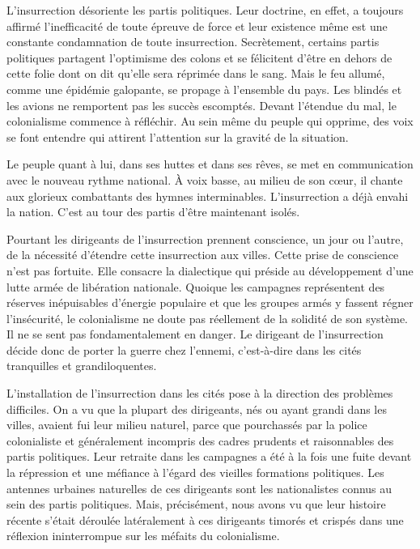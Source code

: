 \documentclass[french,twoside]{book} %
\begin{document}
\bigbreak
\noindent L’insurrection désoriente les partis politiques. Leur doctrine, en effet, a toujours affirmé l’inefficacité de toute épreuve de force et leur existence même est une constante condamnation de toute insurrection. Secrètement, certains partis politiques partagent l’optimisme des colons et se félicitent d’être en dehors de cette folie dont on dit qu’elle sera réprimée dans le sang. Mais le feu allumé, comme une épidémie galopante, se propage à l’ensemble du pays. Les blindés et les avions ne remportent pas les succès escomptés. Devant l’étendue du mal, le colonialisme commence à réfléchir. Au sein même du peuple qui opprime, des voix se font entendre qui attirent l’attention sur la gravité de la situation.\par
Le peuple quant à lui, dans ses huttes et dans ses rêves, se met en communication avec le nouveau rythme national. À voix basse, au milieu de son cœur, il chante aux glorieux combattants des hymnes interminables. L’insurrection a déjà envahi la nation. C’est au tour des partis d’être maintenant isolés.\par
Pourtant les dirigeants de l’insurrection prennent conscience, un jour ou l’autre, de la nécessité d’étendre cette insurrection aux villes. Cette prise de conscience n’est pas fortuite. Elle consacre la dialectique qui préside au développement d’une lutte armée de libération nationale. Quoique les campagnes représentent des réserves inépuisables d’énergie populaire et que les groupes armés y fassent régner l’insécurité, le colonialisme ne doute pas réellement de la solidité de son système. Il ne se sent pas fondamentalement en danger. Le dirigeant de l’insurrection décide donc de porter la guerre chez l’ennemi, c’est-à-dire dans les cités tranquilles et grandiloquentes.\par
L’installation de l’insurrection dans les cités pose à la direction des problèmes difficiles. On a vu que la plupart des dirigeants, nés ou ayant grandi dans les villes, avaient fui leur   milieu naturel, parce que pourchassés par la police colonialiste et généralement incompris des cadres prudents et raisonnables des partis politiques. Leur retraite dans les campagnes a été à la fois une fuite devant la répression et une méfiance à l’égard des vieilles formations politiques. Les antennes urbaines naturelles de ces dirigeants sont les nationalistes connus au sein des partis politiques. Mais, précisément, nous avons vu que leur histoire récente s’était déroulée latéralement à ces dirigeants timorés et crispés dans une réflexion ininterrompue sur les méfaits du colonialisme.\par
\end{document}
